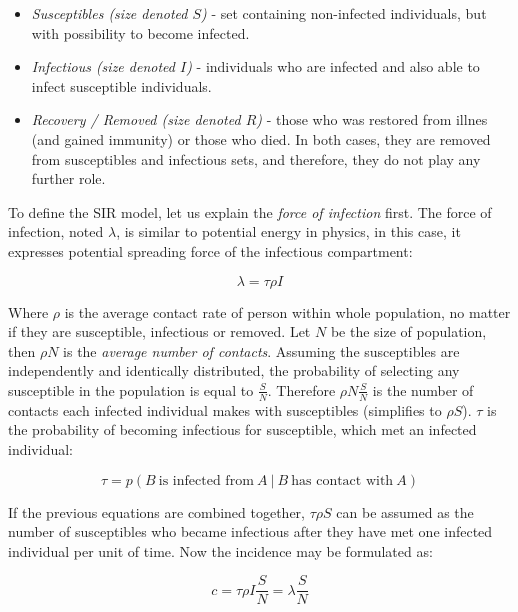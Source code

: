 \documentclass[
  digital, %
  oneside, %
  lof,     %
  lot,     %
]{fithesis4}
\begin{document}
\begin{itemize}
  \item \textit{Susceptibles (size denoted $S$)} - set containing non-infected individuals, but with possibility to become infected.
  \item \textit{Infectious (size denoted $I$)} - individuals who are infected and also able to infect susceptible individuals.
  \item \textit{Recovery / Removed (size denoted $R$)} - those who was restored from illnes (and gained immunity) or those who died. In both cases, they are removed from susceptibles and infectious sets, and therefore, they do not play any further role.
\end{itemize}

To define the SIR model, let us explain the \textit{force of infection} first.
The force of infection, noted $\lambda$, is similar to 
potential energy in physics, in this case, it expresses 
potential spreading force of the infectious compartment:

\begin{equation}
	\lambda = \tau \rho I
\end{equation}

Where $\rho$ is the average contact rate of person within whole 
population, no matter if they are susceptible, infectious 
or removed.
Let $N$ be the size of population,
then $\rho N$ is the \textit{average number of contacts}.
Assuming the susceptibles are independently and identically 
distributed, the probability of selecting any susceptible 
in the population is equal to $\frac{S}{N}$.
Therefore $\rho N\frac{S}{N}$ is the number of contacts 
each infected individual makes with susceptibles 
(simplifies to $\rho S$).
$\tau$ is the probability of becoming infectious for 
susceptible, which met an infected individual:

\begin{equation}
	\tau = p \left( B~\textrm{is infected from}~A~|~B~\textrm{has contact with}~A \right)
\end{equation}

If the previous equations are combined together, 
$\tau \rho S$ can be assumed as the number of 
susceptibles who became infectious after they have 
met one infected individual per unit of time.
Now the incidence may be formulated as:

\begin{equation}
	c = \tau \rho I \frac{S}{N} = \lambda \frac{S}{N}
\end{equation}
\end{document}
